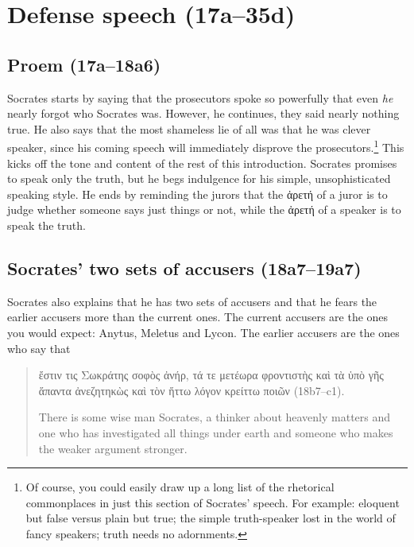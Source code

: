 \documentclass[11pt]{article}
\begin{document}

\section{Defense speech (17a--35d)}

\subsection{Proem (17a--18a6)}

Socrates starts by saying that the prosecutors spoke so powerfully that
even \emph{he} nearly forgot who Socrates was.  However, he continues, they
said nearly nothing true.   He also says that the most shameless lie of all
was that he was clever speaker, since his coming speech will immediately
disprove the prosecutors.\footnote{Of course, you could easily draw up a
long list of the rhetorical commonplaces in just this section of Socrates'
speech.  For example: eloquent but false versus plain but true; the simple
truth-speaker lost in the world of fancy speakers; truth needs no
adornments.}  This kicks off the tone and content of the rest of this
introduction.  Socrates promises to speak only the truth, but he begs
indulgence for his simple, unsophisticated speaking style.  He ends by
reminding the jurors that the {\g ἀρετή} of a juror is to judge whether
someone says just things or not, while the {\g ἀρετή} of a speaker is to
speak the truth.


\subsection{Socrates' two sets of accusers (18a7--19a7)}

Socrates also explains that he has two sets of accusers and that he fears
the earlier accusers more than the current ones.  The current accusers are
the ones you would expect: Anytus, Meletus and Lycon.  The earlier accusers
are the ones who say that

\begin{quote}
    {\g
    ἔστιν τις Σωκράτης σοφὸς ἀνήρ, τά τε μετέωρα φροντιστὴς καὶ τὰ ὑπὸ γῆς
    ἅπαντα ἀνεζητηκὼς καὶ τὸν ἥττω λόγον κρείττω ποιῶν
    } (18b7--c1).

    There is some wise man Socrates, a thinker about heavenly matters and
    one who has investigated all things under earth and someone who makes
    the weaker argument stronger.
\end{quote}
\end{document}
